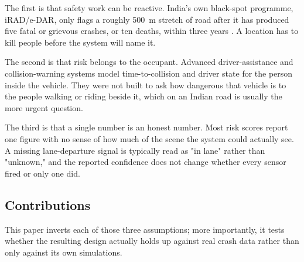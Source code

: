 \documentclass[journal]{IEEEtran}
\begin{document}
The first is that safety work can be reactive. India's own black-spot programme, iRAD/e-DAR, only flags a roughly 500~m stretch of road after it has produced five fatal or grievous crashes, or ten deaths, within three years \cite{morth}. A location has to kill people before the system will name it.

The second is that risk belongs to the occupant. Advanced driver-assistance and collision-warning systems model time-to-collision and driver state for the person inside the vehicle. They were not built to ask how dangerous that vehicle is to the people walking or riding beside it, which on an Indian road is usually the more urgent question.

The third is that a single number is an honest number. Most risk scores report one figure with no sense of how much of the scene the system could actually see. A missing lane-departure signal is typically read as "in lane" rather than "unknown," and the reported confidence does not change whether every sensor fired or only one did.

\subsection{Contributions}

This paper inverts each of those three assumptions; more importantly, it tests whether the resulting design actually holds up against real crash data rather than only against its own simulations.
\end{document}
